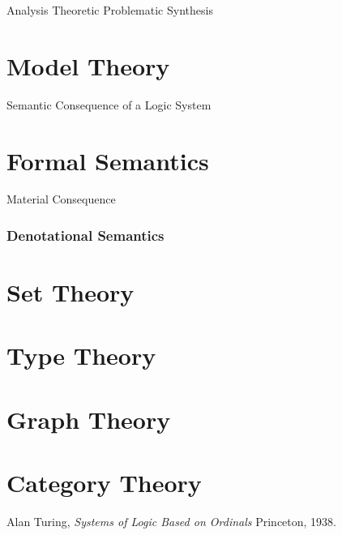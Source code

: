 \documentclass{article}
\begin{document}
Analysis
    Theoretic
    Problematic
Synthesis


\part{Model Theory}

Semantic Consequence of a Logic System

\part{Formal Semantics}

Material Consequence

\section{Denotational Semantics}

\part{Set Theory}

\part{Type Theory}

\part{Graph Theory}

\part{Category Theory}

\begin{thebibliography}{9}

    Alan Turing,
    \emph{Systems of Logic Based on Ordinals}
    Princeton,
    1938.

\end{thebibliography}
\end{document}
